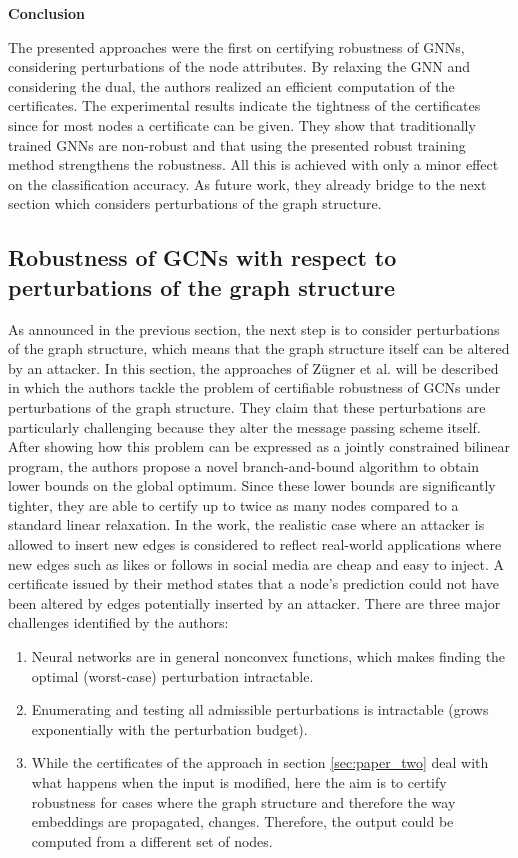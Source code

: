 \documentclass[a4paper,preprint]{sig-alternate}
\begin{document}
\vfill
\pagebreak

\textbf{Conclusion}\newline

The presented approaches were the first on certifying robustness of GNNs, considering perturbations of the node attributes.
By relaxing the GNN and considering the dual, the authors realized an efficient computation of the certificates.
The experimental results indicate the tightness of the certificates since for most nodes a certificate can be given.
They show that traditionally trained GNNs are non-robust and that using the presented robust training method strengthens the robustness.
All this is achieved with only a minor effect on the classification accuracy. 
As future work, they already bridge to the next section which considers perturbations of the graph structure.

\subsection{Robustness of GCNs with respect to perturbations of the graph structure}
\label{sec:paper_three}

As announced in the previous section, the next step is to consider perturbations of the graph structure,
which means that the graph structure itself can be altered by an attacker.
In this section, the approaches of Zügner et al. \cite{10.1145/3394486.3403217} will be described in which the authors
tackle the problem of certifiable robustness of GCNs under perturbations of the graph structure. They claim that these perturbations 
are particularly challenging because they alter the message passing scheme itself.
After showing how this problem can be expressed as a jointly constrained bilinear program, the authors propose a novel branch-and-bound
algorithm to obtain lower bounds on the global optimum. Since these lower bounds are significantly tighter, they are able to
certify up to twice as many nodes compared to a standard linear relaxation.
In the work, the realistic case where an attacker is allowed to insert new edges is considered to reflect real-world
applications where new edges such as likes or follows in social media are cheap and easy to inject. A certificate issued by their method 
states that a node's prediction could not have been altered by edges potentially inserted by an attacker. 
There are three major challenges identified by the authors:
\begin{enumerate}
    \item Neural networks are in general nonconvex functions, which makes finding the optimal (worst-case)
    perturbation intractable.
    \item Enumerating and testing all admissible perturbations is intractable (grows exponentially with the perturbation budget).
    \item While the certificates of the approach in section \ref{sec:paper_two} deal with what happens when the input is modified, here the
    aim is to certify robustness for cases where the graph structure and therefore the way embeddings are propagated, changes.
    Therefore, the output could be computed from a different set of nodes.
\end{enumerate}
\end{document}
